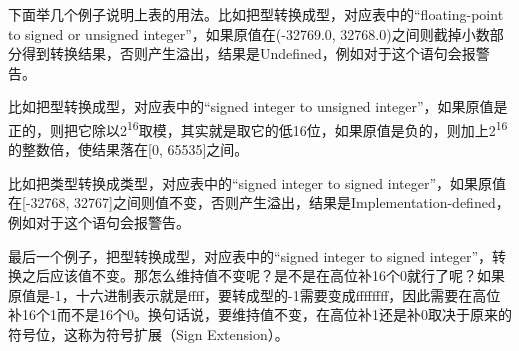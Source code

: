下面举几个例子说明上表的用法。比如把型转换成型，对应表中的“floating-point to signed or unsigned integer”，如果原值在(-32769.\BookSplit{}0, 32768.\BookSplit{}0)之间则截掉小数部分得到转换结果，否则产生溢出，结果是Undefined，例如对于这个语句会报警告。



比如把型转换成型，对应表中的“signed integer to unsigned integer”，如果原值是正的，则把它除以2\textsuperscript{16}取模，其实就是取它的低16位，如果原值是负的，则加上2\textsuperscript{16}的整数倍，使结果落在[0, 65535]之间。



比如把类型转换成类型，对应表中的“signed integer to signed integer”，如果原值在[-32768, 32767]之间则值不变，否则产生溢出，结果是Implementation-defined，例如对于这个语句会报警告。



最后一个例子，把型转换成型，对应表中的“signed integer to signed integer”，转换之后应该值不变。那怎么维持值不变呢？是不是在高位补16个0就行了呢？如果原值是-1，十六进制表示就是ffff，要转成型的-1需要变成ffffffff，因此需要在高位补16个1而不是16个0。换句话说，要维持值不变，在高位补1还是补0取决于原来的符号位，这称为符号扩展（Sign Extension）。

